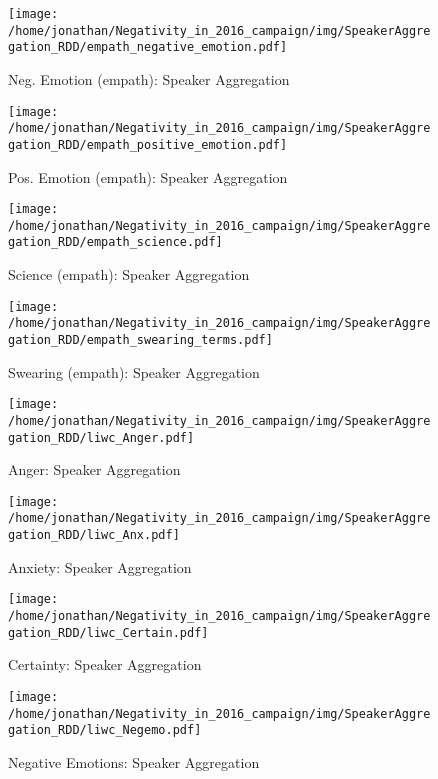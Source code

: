 \begin{figure}[h]\centering
	\texttt{[image: /home/jonathan/Negativity\_in\_2016\_campaign/img/SpeakerAggregation\_RDD/empath\_negative\_emotion.pdf]}
	\caption{Neg. Emotion (empath): Speaker Aggregation}
	\label{fig: sa_Neg. Emotion (empath)}
\end{figure}

\begin{figure}[h]\centering
	\texttt{[image: /home/jonathan/Negativity\_in\_2016\_campaign/img/SpeakerAggregation\_RDD/empath\_positive\_emotion.pdf]}
	\caption{Pos. Emotion (empath): Speaker Aggregation}
	\label{fig: sa_Pos. Emotion (empath)}
\end{figure}

\begin{figure}[h]\centering
	\texttt{[image: /home/jonathan/Negativity\_in\_2016\_campaign/img/SpeakerAggregation\_RDD/empath\_science.pdf]}
	\caption{Science (empath): Speaker Aggregation}
	\label{fig: sa_Science (empath)}
\end{figure}

\begin{figure}[h]\centering
	\texttt{[image: /home/jonathan/Negativity\_in\_2016\_campaign/img/SpeakerAggregation\_RDD/empath\_swearing\_terms.pdf]}
	\caption{Swearing (empath): Speaker Aggregation}
	\label{fig: sa_Swearing (empath)}
\end{figure}

\begin{figure}[h]\centering
	\texttt{[image: /home/jonathan/Negativity\_in\_2016\_campaign/img/SpeakerAggregation\_RDD/liwc\_Anger.pdf]}
	\caption{Anger: Speaker Aggregation}
	\label{fig: sa_Anger}
\end{figure}

\begin{figure}[h]\centering
	\texttt{[image: /home/jonathan/Negativity\_in\_2016\_campaign/img/SpeakerAggregation\_RDD/liwc\_Anx.pdf]}
	\caption{Anxiety: Speaker Aggregation}
	\label{fig: sa_Anxiety}
\end{figure}

\begin{figure}[h]\centering
	\texttt{[image: /home/jonathan/Negativity\_in\_2016\_campaign/img/SpeakerAggregation\_RDD/liwc\_Certain.pdf]}
	\caption{Certainty: Speaker Aggregation}
	\label{fig: sa_Certainty}
\end{figure}

\begin{figure}[h]\centering
	\texttt{[image: /home/jonathan/Negativity\_in\_2016\_campaign/img/SpeakerAggregation\_RDD/liwc\_Negemo.pdf]}
	\caption{Negative Emotions: Speaker Aggregation}
	\label{fig: sa_Negative Emotions}
\end{figure}

